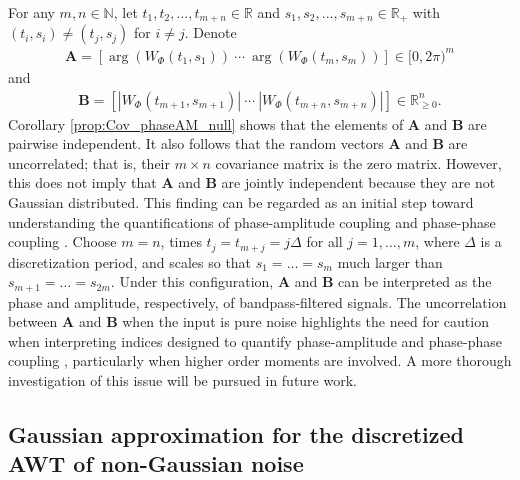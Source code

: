 \documentclass{amsart}
\begin{document}
 For any $m,n\in \mathbb{N}$, let $t_{1},t_{2},...,t_{m+n}\in \mathbb{R}$ and $s_{1},s_{2},...,s_{m+n}\in \mathbb{R}_{+}$ with $(t_{i},s_{i})\neq(t_{j},s_{j})$ for $i\neq j$. Denote
\begin{align*}
\mathbf{A} = \left[\arg(W_{\Phi}(t_{1},s_{1}))\ \cdots\ \arg(W_{\Phi}(t_{m},s_{m}))\right]\in [0,2\pi)^{m}
\end{align*}
and
\begin{align*}
\mathbf{B} = \left[|W_{\Phi}(t_{m+1},s_{m+1})|\ \cdots\ |W_{\Phi}(t_{m+n},s_{m+n})|\right]\in \mathbb{R}^{n}_{\geq 0}.
\end{align*}
Corollary \ref{prop:Cov_phaseAM_null} shows that the elements of $\mathbf{A}$ and $\mathbf{B}$ are pairwise independent. It also follows that
the random vectors $\mathbf{A}$ and $\mathbf{B}$ are uncorrelated; that is, their $m\times n$ covariance matrix is the
zero matrix. However,  this does not imply that $\mathbf{A}$ and $\mathbf{B}$ are jointly independent because they are not Gaussian distributed.
This finding can be regarded as an initial step toward understanding the quantifications of phase-amplitude coupling and phase-phase coupling \cite{tort2010measuring,hulsemann2019quantification}. Choose $m=n$, times $t_j=t_{m+j}=j\Delta$ for all $j=1,\ldots,m$, where $\Delta$ is a discretization period, and scales so that $s_1=\ldots=s_m$ much larger than $s_{m+1}=\ldots=s_{2m}$. Under this configuration, $\mathbf{A}$ and $\mathbf{B}$ can be interpreted as the phase and amplitude, respectively, of bandpass-filtered signals. The uncorrelation between $\mathbf{A}$ and $\mathbf{B}$ when the input is pure noise highlights the need for caution when interpreting indices designed to quantify phase-amplitude and phase-phase coupling \cite{tort2010measuring,hulsemann2019quantification}, particularly when higher order moments are involved. A more thorough investigation of this issue will be pursued in future work.







\subsection{Gaussian approximation for the discretized AWT of non-Gaussian noise}\label{sec:Gaussian_approxi}
\end{document}
